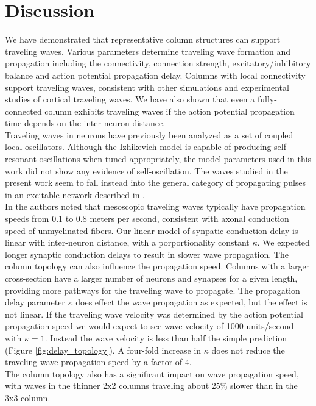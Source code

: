 \documentclass[a4paper,11pt]{article}
\begin{document}
\section{Discussion}
We have demonstrated that representative column structures can support traveling waves.
Various parameters determine traveling wave formation and propagation including the connectivity, connection strength, excitatory/inhibitory balance and action potential propagation delay.
Columns with local connectivity support traveling waves, consistent with other simulations and experimental studies of cortical traveling waves.
We have also shown that even a fully-connected column exhibits traveling waves if the action potential propagation time depends on the inter-neuron distance. 
\\
Traveling waves in neurons have previously been analyzed as a set of coupled local oscillators.
Although the Izhikevich model is capable of producing self-resonant oscillations when tuned appropriately, the model parameters used in this work did not show any evidence of self-oscillation.
The waves studied in the present work seem to fall instead into the general category of propagating pulses in an excitable network described in \cite{ermentrout2001}. 
\\
In \cite{muller2018} the authors noted that mesoscopic traveling waves typically have propagation speeds from 0.1 to 0.8 meters per second, consistent with axonal conduction speed of unmyelinated fibers.
Our linear model of synpatic conduction delay is linear with inter-neuron distance, with a porportionality constant $\kappa$.
We expected longer synaptic conduction delays to result in slower wave propagation.
The column topology can also influence the propagation speed.
Columns with a larger cross-section have a larger number of neurons and synapses for a given length, providing more pathways for the traveling wave to propagate.
The propagation delay parameter $\kappa$ does effect the wave propagation as expected, but the effect is not linear.
If the traveling wave velocity was determined by the action potential propagation speed we would expect to see wave velocity of 1000 units/second with $\kappa=1$.
Instead the wave velocity is less than half the simple prediction (Figure \ref{fig:delay_topology}).
A four-fold increase in $\kappa$ does not reduce the traveling wave propagation speed by a factor of 4. 
\\
The column topology also has a significant impact on wave propagation speed, with waves in the thinner 2x2 columns traveling about $25\%$ slower than in the 3x3 column.
\end{document}
